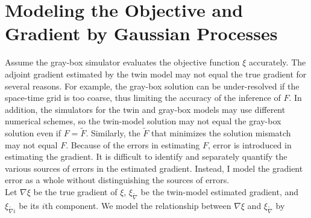 
\section{Modeling the Objective and Gradient by Gaussian Processes}
\label{sec: chap3 cokriging}
Assume the gray-box simulator evaluates the objective function $\xi$ accurately.
The adjoint gradient estimated by the twin model may not equal
the true gradient for several reasons. For example, 
the gray-box solution can be under-resolved if the space-time grid is too coarse, 
thus limiting the accuracy of 
the inference of $F$.
In addition, the simulators for the twin and gray-box models may use different
numerical schemes, so the twin-model solution may not equal the gray-box solution
even if $F=\tilde{F}$. Similarly, the $\tilde{F}$ that minimizes the solution mismatch may not
equal $F$. Because of the errors in estimating $F$, error is introduced in estimating the gradient.
It is difficult to identify and separately quantify the various sources of errors 
in the estimated gradient.
Instead, I model the gradient error as a whole without 
distinguishing the sources of errors.\\


Let $\nabla\xi$ be the true gradient of $\xi$,
$\xi_{\tilde{\nabla}}$ be the twin-model estimated gradient,
and
$\xi_{\tilde{\nabla}i}$ be its $i$th component.
We model the relationship between $\nabla \xi$ and $\xi_{\tilde{\nabla}}$ by
\cite{non param calibrate 1, non param calibrate 2, non param calibrate 3}

